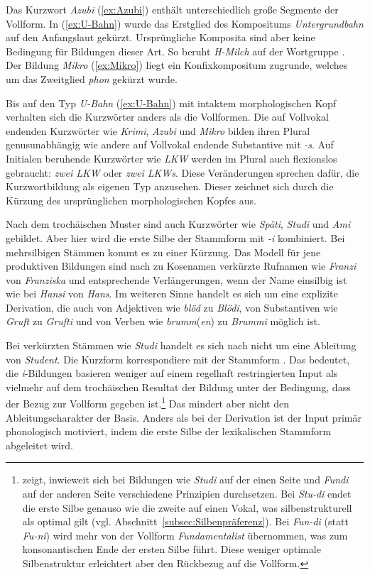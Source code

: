 Das Kurzwort \textit{Azubi} (\ref{ex:Azubi}) enthält unterschiedlich große Segmente der Vollform. In (\ref{ex:U-Bahn}) wurde das Erstglied des Kompositums \textit{Untergrundbahn} auf den Anfangslaut gekürzt. Ursprüngliche Komposita sind aber keine Bedingung für Bildungen dieser Art. So beruht \textit{H-Milch} auf der Wortgruppe . Der Bildung \textit{Mikro} (\ref{ex:Mikro}) liegt ein Konfixkompositum zugrunde, welches um das Zweitglied \textit{phon} gekürzt wurde. 

Bis auf den Typ \textit{U-Bahn} (\ref{ex:U-Bahn}) mit intaktem morphologischen Kopf verhalten sich die Kurzwörter anders als die Vollformen. Die auf Vollvokal endenden Kurzwörter wie \textit{Krimi}, \textit{Azubi} und \textit{Mikro} bilden ihren Plural genusunabhängig wie andere auf Vollvokal endende Substantive mit \textit{-s}. Auf Initialen beruhende Kurzwörter wie \textit{LKW} werden im Plural auch flexionslos gebraucht: \textit{zwei LKW} oder \textit{zwei LKWs}. Diese Veränderungen sprechen dafür, die Kurzwortbildung als eigenen Typ anzusehen. Dieser zeichnet sich durch die Kürzung des ursprünglichen morphologischen Kopfes aus.

Nach dem trochäischen Muster sind auch Kurzwörter wie \textit{Späti}, \textit{Studi} und \textit{Ami} gebildet. Aber hier wird die erste Silbe der Stammform mit \textit{-i} kombiniert. Bei mehrsilbigen Stämmen kommt es zu einer Kürzung. Das Modell für jene produktiven Bildungen sind nach \citet[295]{Koepcke2003} zu Kosenamen verkürzte Rufnamen wie \textit{Franzi} von \textit{Franziska} und entsprechende Verlängerungen, wenn der Name einsilbig ist wie bei \textit{Hansi} von \textit{Hans}. Im weiteren Sinne handelt es sich um eine explizite Derivation, die auch von Adjektiven wie \textit{blöd} zu \textit{Blödi}, von Substantiven wie \textit{Gruft} zu \textit{Grufti} und von Verben wie \textit{brumm}(\textit{en}) zu \textit{Brummi} möglich ist. 

Bei verkürzten Stämmen wie \textit{Studi} handelt es sich nach \citet[471]{Fery1997} nicht um eine Ableitung von \textit{Student}. Die Kurzform korrespondiere mit der Stammform . Das bedeutet, die \textit{i}-Bildungen basieren weniger auf einem regelhaft restringierten Input als vielmehr auf dem trochäischen Resultat der Bildung unter der Bedingung, dass der Bezug zur Vollform gegeben ist.\footnote{\citet[480]{Fery1997} zeigt, inwieweit sich bei Bildungen wie \textit{Studi} auf der einen Seite und \textit{Fundi} auf der anderen Seite verschiedene Prinzipien durchsetzen. Bei \textit{Stu-di} endet die erste Silbe genauso wie die zweite auf einen Vokal, was silbenstrukturell als optimal gilt (vgl. Abschnitt~\ref{subsec:Silbenpräferenz}). Bei \textit{Fun-di} (statt \textit{Fu-ni}) wird mehr von der Vollform \textit{Fundamentalist} übernommen, was zum konsonantischen Ende der ersten Silbe führt. Diese weniger optimale Silbenstruktur erleichtert aber den Rückbezug auf die Vollform.} Das mindert aber nicht den Ableitungscharakter der Basis. Anders als bei der Derivation ist der Input primär phonologisch motiviert, indem die erste Silbe der lexikalischen Stammform abgeleitet wird.

